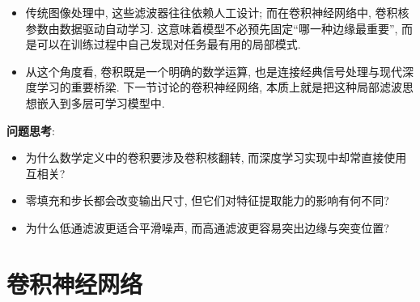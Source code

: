 \documentclass{../nndlcourse}
\begin{document}
\begin{enumerate}
\begin{itemize}
\begin{equation*}
            G(x,y) = \frac{1}{2 \pi \sigma^2} \exp\left(-\frac{x^2 + y^2}{2\sigma^2}\right).
        \end{equation*}
        将它在离散网格上采样并归一化后, 常得到类似如下的 $3 \times 3$ 滤波器:
        \begin{equation*}
            \frac{1}{16}
            \begin{bmatrix}
                1 & 2 & 1 \\
                2 & 4 & 2 \\
                1 & 2 & 1
            \end{bmatrix}.
        \end{equation*}
        之所以称为“高斯滤波”, 是因为滤波器各位置的权重来自高斯函数的取值: 越靠近中心, 权重越大; 越远离中心, 权重按高斯曲线的方式平滑衰减. 这种加权平均方式既能抑制高频噪声, 又不会像简单均值滤波那样过于生硬. 高通滤波则更适合突出边缘和纹理. 例如拉普拉斯算子
        \begin{equation*}
            \begin{bmatrix}
                0 & 1 & 0 \\
                1 & -4 & 1 \\
                0 & 1 & 0
            \end{bmatrix}
        \end{equation*}
        会对像素变化剧烈的位置产生更强响应, 因而可用于边缘检测.
        \item 传统图像处理中, 这些滤波器往往依赖人工设计; 而在卷积神经网络中, 卷积核参数由数据驱动自动学习. 这意味着模型不必预先固定“哪一种边缘最重要”, 而是可以在训练过程中自己发现对任务最有用的局部模式.
        \item 从这个角度看, 卷积既是一个明确的数学运算, 也是连接经典信号处理与现代深度学习的重要桥梁. 下一节讨论的卷积神经网络, 本质上就是把这种局部滤波思想嵌入到多层可学习模型中.
    \end{itemize}
\end{enumerate}

\textbf{问题思考}:
\begin{itemize}
    \item 为什么数学定义中的卷积要涉及卷积核翻转, 而深度学习实现中却常直接使用互相关?
    \item 零填充和步长都会改变输出尺寸, 但它们对特征提取能力的影响有何不同?
    \item 为什么低通滤波更适合平滑噪声, 而高通滤波更容易突出边缘与突变位置?
\end{itemize}

\section{卷积神经网络}
\end{document}
